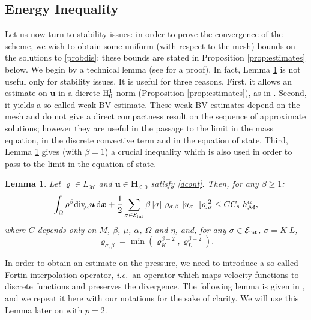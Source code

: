 \documentclass{amsart}
\newtheorem{lm}{Lemma}
\numberwithin{equation}{section}
\begin{document}
\subsection{Energy Inequality}

Let us now turn to stability issues: in order to prove the convergence of the scheme, we wish to obtain some uniform (with respect to the mesh) bounds on the solutions to \eqref{probdis};
these bounds are stated in Proposition \ref{prop:estimates} below.
We begin by a technical lemma (see \cite[Lemma 5.4]{eymard2010convergence} for a proof).
In fact, Lemma \ref{lmm:renorm} is not useful only for stability issues. It is useful for three reasons.
First, it allows an estimate on ${{\boldsymbol u}}$ in a dicrete ${{\rm H}}^1_0$ norm (Proposition \ref{prop:estimates}), as in \cite[Proposition 5.5]{eymard2010convergence}. 
Second, it yields a so called weak BV estimate.
These weak BV estimates depend on the mesh and do not give a direct compactness result on the sequence of approximate solutions; however they are useful
 in the passage to the limit in the mass equation, in the discrete convective term and in the equation of state.
Third, Lemma \ref{lmm:renorm}  gives (with $\beta=1$) a crucial inequality which is also used in order to pass to the limit in the equation of state. 
\begin{lm}
Let ${\varrho} \in L_{{\mathcal M}}$ and ${{\boldsymbol u}} \in {{\mathbf{H}_{{{\mathcal E}},0}}}$ satisfy \eqref{dcont}.
Then, for any $\beta \geq 1$:
\[
\int_\Omega {\varrho}^\beta {{\rm div}_{\hspace{-0.2em}\raisebox{-0.1em}{\scalebox{0.5}{${{\mathcal M}}$}}}} {{\boldsymbol u}} {\, {\rm d}{{\boldsymbol x}}}
+\frac 1 2 \sum_{{{\sigma}} \in {{\mathcal E}_{\rm int}}} \beta\, |{{\sigma}}|\  {\varrho}_{{{\sigma}},\beta} \ |{{u}_{{\sigma}}}|\ [{\varrho}]_{{\sigma}}^2
\leq C C_s\ h_{{\mathcal M}}^\alpha,
\]
where $C$ depends only on ${M}$, $\beta$, $\mu$, $\alpha$, $\Omega$ and $\eta$, and, for any ${{\sigma}} \in {{\mathcal E}_{\rm int}}$, ${{\sigma}}=K|L$,
\begin{equation}  
{\varrho}_{{{\sigma}},\beta} = \min( {\varrho}_K^{\beta-2}, {\varrho}_L^{\beta-2}). 
\label{rhosigmabeta}
\end{equation}

\label{lmm:renorm}\end{lm}

\bigskip
In order to obtain an  estimate on the pressure, we need to introduce a so-called Fortin interpolation operator, {\emph{i.e.\/}}\ an operator which maps velocity functions to discrete functions and preserves the divergence. 
The following lemma is given in  \cite[Theorem 1]{gallouet2012w1}, and we repeat it here with our notations for the sake of clarity.
We will use this Lemma later on with $p=2$.
\end{document}
